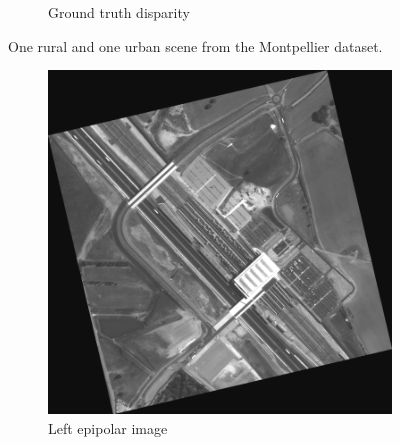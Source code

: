 \begin{figure}[ht!]
\begin{subfigure}[t]{0.4\linewidth}
        \caption{Ground truth disparity}
        \label{fig:mtp_img_d}
    \end{subfigure}
    \caption{One rural and one urban scene from the Montpellier dataset.} 
    \label{fig:mtp_img}
\end{figure}


\begin{figure}[ht!]
    \centering
    \begin{subfigure}[t]{0.4\linewidth}
        \centering
        \includegraphics[width=\linewidth]{Images/Chap_5/img_error_MTP_278.png}
        \caption{Left epipolar image}
        \label{fig:mtp_278_a}
    \end{subfigure}\hfill
    \begin{subfigure}[t]{0.4\linewidth}
        \centering

\end{subfigure}
\end{figure}
